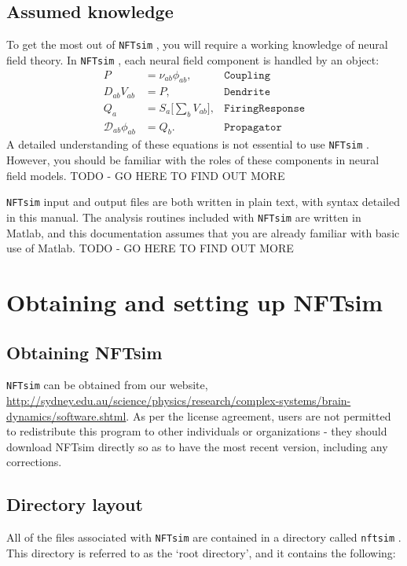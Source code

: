 \documentclass[12pt,a4paper]{article}
\newcommand{\type}[1]{{\small\small\tt #1} }
\newcommand{\NF}[0]{\type{NFTsim}}
\begin{document}
\subsection*{Assumed knowledge}
To get the most out of \NF, you will require a working knowledge of neural field theory. In \NF, each neural field component is handled by an object:
\begin{align*}
    P &= \nu_{ab}\phi_{ab}, & \mathtt{Coupling}\\
    D_{ab}V_{ab} &= P, & \mathtt{Dendrite}\\
    Q_a &= S_a \big[\sum_b V_{ab} \big], & \mathtt{FiringResponse}\\
    \mathcal{D}_{ab}\phi_{ab} &= Q_b.&  \mathtt{Propagator}
\end{align*}
A detailed understanding of these equations is not essential to use \NF. However, you should be familiar with the roles of these components in neural field models. TODO - GO HERE TO FIND OUT MORE

\NF input and output files are both written in plain text, with syntax detailed in this manual. The analysis routines included with \NF are written in Matlab, and this documentation assumes that you are already familiar with basic use of Matlab. TODO - GO HERE TO FIND OUT MORE

\section{Obtaining and setting up NFTsim}
\label{sec:obtain}

\subsection{Obtaining NFTsim}

\NF can be obtained from our website, \url{http://sydney.edu.au/science/physics/research/complex-systems/brain-dynamics/software.shtml}. As per the license agreement, users are not permitted to redistribute this program to other individuals or organizations - they should download NFTsim directly so as to have the most recent version, including any corrections.

\subsection{Directory layout}

All of the files associated with \NF are contained in a directory called \type{nftsim}. This directory is referred to as the `root directory', and it contains the following:
\end{document}
